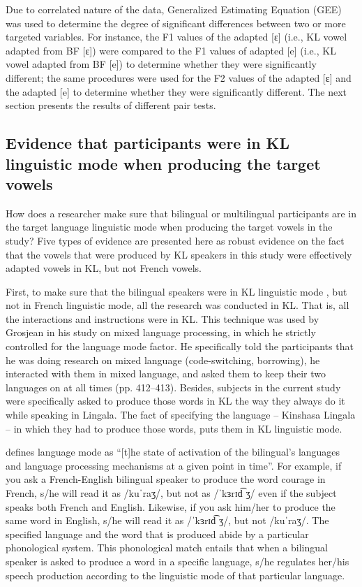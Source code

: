 \documentclass[output=paper]{langscibook}
\begin{document}
Due to correlated nature of the data, Generalized Estimating Equation (GEE) was used to determine the degree of significant differences between two or more targeted variables. For instance, the F1 values of the adapted [ɛ] (i.e., KL vowel adapted from BF [ɛ]) were compared to the F1 values of adapted [e] (i.e., KL vowel adapted from BF [e]) to determine whether they were significantly different; the same procedures were used for the F2 values of the adapted [ɛ] and the adapted [e] to determine whether they were significantly different. The next section presents the results of different pair tests.

\subsection{Evidence that participants were in KL linguistic mode when producing the target vowels}\largerpage
How does a researcher make sure that bilingual or multilingual participants are in the target language linguistic mode when producing the target vowels in the study? Five types of evidence are presented here as robust evidence on the fact that the vowels that were produced by KL speakers in this study were effectively adapted vowels in KL, but not French vowels.

First, to make sure that the bilingual speakers were in KL linguistic mode \citep{grosjean2001bilingual}, but not in French linguistic mode, all the research was conducted in KL. That is, all the interactions and instructions were in KL. This technique was used by Grosjean in his study on mixed language processing, in which he strictly controlled for the language mode factor. He specifically told the participants that he was doing research on mixed language (code-switching, borrowing), he interacted with them in mixed language, and asked them to keep their two languages on at all times (pp. 412--413). Besides, subjects in the current study were specifically asked to produce those words in KL the way they always do it while speaking in Lingala. The fact of specifying the language – Kinshasa Lingala – in which they had to produce those words, puts them in KL linguistic mode.

\citet[2]{grosjean2001bilingual} defines language mode as “[t]he state of activation of the bilingual’s languages and language processing mechanisms at a given point in time”.  For example,  if you ask a French-English bilingual speaker to produce the word courage in French, s/he will read it as /kuˈraʒ/, but not as /ˈkɜrɪd͡ ʒ/ even if the subject speaks both French and English. Likewise, if you ask him/her to produce the same word in English, s/he will read it as /ˈkɜrɪd͡ ʒ/, but not /kuˈraʒ/. The specified language and the word that is produced abide by a particular phonological system. This phonological match entails that when a bilingual speaker is asked to produce a word in a specific language, s/he regulates her/his speech production according to the linguistic mode of that particular language.
\end{document}
